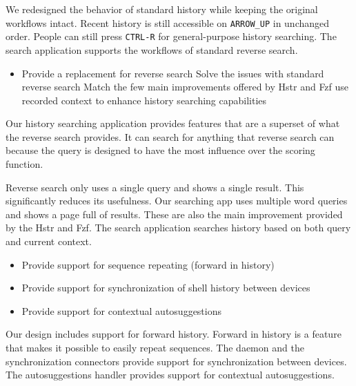 We redesigned the behavior of standard history while keeping the original workflows intact. Recent history is still accessible on \verb|ARROW_UP| in unchanged order. People can still press \verb|CTRL-R| for general-purpose history searching. 
The search application supports the workflows of standard reverse search.

\begin{itemize}
\item Provide a replacement for reverse search
\subitem Solve the issues with standard reverse search
\subitem Match the few main improvements offered by Hstr and Fzf
\subitem use recorded context to enhance history searching capabilities
\end{itemize}

Our history searching application provides features that are a superset of what the reverse search provides. It can search for anything that reverse search can because the query is designed to have the most influence over the scoring function.

Reverse search only uses a single query and shows a single result. This significantly reduces its usefulness. Our searching app uses multiple word queries and shows a page full of results. These are also the main improvement provided by the Hstr and Fzf.
The search application searches history based on both query and current context.

\begin{itemize}
\item Provide support for sequence repeating (forward in history)
\item Provide support for synchronization of shell history between devices
\item Provide support for contextual autosuggestions
\end{itemize}

Our design includes support for forward history. Forward in history is a feature that makes it possible to easily repeat sequences. 
The daemon and the synchronization connectors provide support for synchronization between devices. The autosuggestions handler provides support for contextual autosuggestions.

